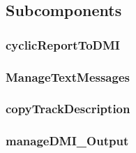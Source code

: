 \subsection{Subcomponents}\label{s:ManageDMIOutput_subcomponents}


\subsubsection{cyclicReportToDMI}


\subsubsection{ManageTextMessages}


\subsubsection{copyTrackDescription}


%
%
%

\subsubsection{manageDMI\_Output}


%

%
%
%







